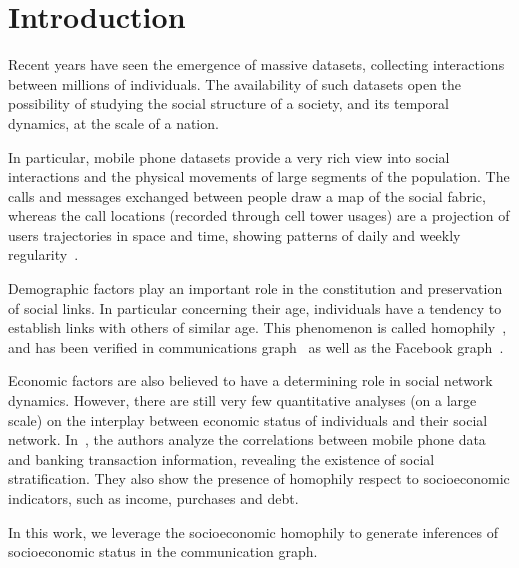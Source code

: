 \section{Introduction}

Recent years have seen the emergence of massive datasets, collecting interactions between millions of individuals. The availability of such datasets open the possibility of studying the social structure of a society, and its temporal dynamics, at the scale of a nation.

In particular, mobile phone datasets provide a very rich view into social interactions and the physical movements of large segments of the population. The calls and messages exchanged between people draw a map of the social fabric, whereas the call locations (recorded through cell tower usages) are a projection of users trajectories in space and time, showing patterns of daily and weekly regularity~\cite{gonzalez2008understanding,ponieman2013human,sarraute2015city}.

Demographic factors play an important role in the constitution and preservation of social links. In particular concerning their age, individuals have a tendency to
establish links with others of similar age. This phenomenon is called homophily~\cite{mcpherson2001birds}, and has been verified in communications graph~\cite{blumenstock2010mobile,sarraute2014} as well as the Facebook graph~\cite{ugander2011anatomy}.

Economic factors are also believed to have a determining role in social network dynamics.
However, there are still very few quantitative analyses (on a large scale) on the interplay between economic status of individuals and their social network.
In~\cite{leo2015socioeconomic}, the authors analyze the correlations between mobile phone data and banking transaction information, revealing the existence of social stratification. They also show the presence of homophily respect to socioeconomic indicators, such as income, purchases and debt.

In this work, we leverage the socioeconomic homophily to generate inferences of socioeconomic status in the communication graph.

